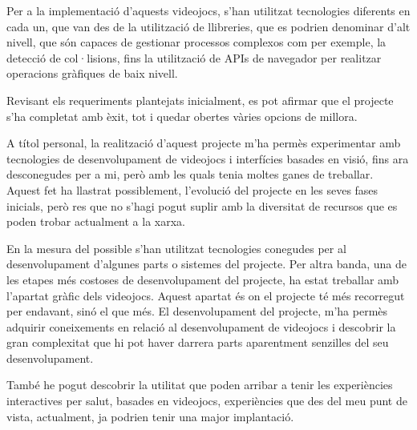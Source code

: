 \documentclass[12pt,a4paper,catalan]{article}
\begin{document}
	Per a la implementació d'aquests videojocs, s'han utilitzat tecnologies diferents en cada un, que van des de la utilització de llibreries, que es podrien denominar d'alt nivell, que són capaces de gestionar processos complexos com per exemple, la detecció de col·lisions, fins la utilització de APIs de navegador per realitzar operacions gràfiques de baix nivell.
	
	
	Revisant els requeriments plantejats inicialment, es pot afirmar que el projecte s'ha completat amb èxit, tot i quedar obertes vàries opcions de millora.
	
	A títol personal, la realització d'aquest projecte m'ha permès experimentar amb tecnologies de desenvolupament de videojocs i interfícies basades en visió, fins ara desconegudes per a mi, però amb les quals tenia moltes ganes de treballar. Aquest fet ha llastrat possiblement, l'evolució del projecte en les seves fases inicials, però res que no s'hagi pogut suplir amb la diversitat de recursos que es poden trobar actualment a la xarxa.
	
	En la mesura del possible s'han utilitzat tecnologies conegudes per al desenvolupament d'algunes parts o sistemes del projecte.
	Per altra banda, una de les etapes més costoses de desenvolupament del projecte, ha estat treballar amb l'apartat gràfic dels videojocs. Aquest apartat és on el projecte té més recorregut per endavant, sinó el que més.
	El desenvolupament del projecte, m'ha permès adquirir coneixements en relació al desenvolupament de videojocs i descobrir la gran complexitat que hi pot haver darrera parts aparentment senzilles del seu desenvolupament.
	
	També he pogut descobrir la utilitat que poden arribar a tenir les experiències interactives per salut, basades en videojocs, experiències que des del meu punt de vista, actualment, ja podrien tenir una major implantació.
	\clearpage
	\printbibliography[heading=bibnumbered,title={Referències}]
\end{document}
